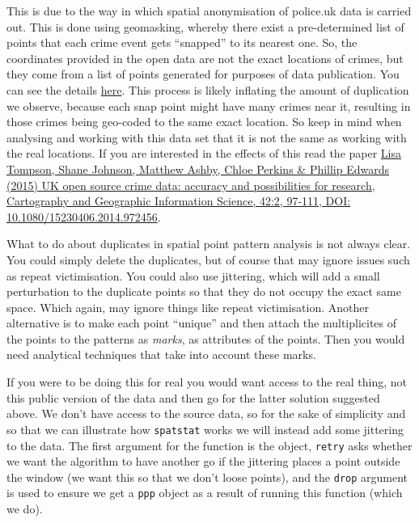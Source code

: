 \documentclass[]{book}
\begin{document}
This is due to the way in which spatial anonymisation of police.uk data is carried out. This is done using geomasking, whereby there exist a pre-determined list of points that each crime event gets ``snapped'' to its nearest one. So, the coordinates provided in the open data are not the exact locations of crimes, but they come from a list of points generated for purposes of data publication. You can see the details \href{https://data.police.uk/about/\#anonymisation}{here}. This process is likely inflating the amount of duplication we observe, because each snap point might have many crimes near it, resulting in those crimes being geo-coded to the same exact location. So keep in mind when analysing and working with this data set that it is not the same as working with the real locations. If you are interested in the effects of this read the paper \href{https://www.tandfonline.com/doi/abs/10.1080/15230406.2014.972456}{Lisa Tompson, Shane Johnson, Matthew Ashby, Chloe Perkins \& Phillip Edwards (2015) UK open source crime data: accuracy and possibilities for research, Cartography and Geographic Information Science, 42:2, 97-111, DOI: 10.1080/15230406.2014.972456}.

What to do about duplicates in spatial point pattern analysis is not always clear. You could simply delete the duplicates, but of course that may ignore issues such as repeat victimisation. You could also use jittering, which will add a small perturbation to the duplicate points so that they do not occupy the exact same space. Which again, may ignore things like repeat victimisation. Another alternative is to make each point ``unique'' and then attach the multiplicites of the points to the patterns as \emph{marks}, as attributes of the points. Then you would need analytical techniques that take into account these marks.

If you were to be doing this for real you would want access to the real thing, not this public version of the data and then go for the latter solution suggested above. We don't have access to the source data, so for the sake of simplicity and so that we can illustrate how \texttt{spatstat} works we will instead add some jittering to the data. The first argument for the function is the object, \texttt{retry} asks whether we want the algorithm to have another go if the jittering places a point outside the window (we want this so that we don't loose points), and the \texttt{drop} argument is used to ensure we get a \texttt{ppp} object as a result of running this function (which we do).
\end{document}
